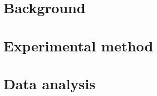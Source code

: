 
\part{Background}










\part{Experimental method}



\part{Data analysis}


\printbibliography
\cleardoublepage

\begin{appendices}

\end{appendices}



